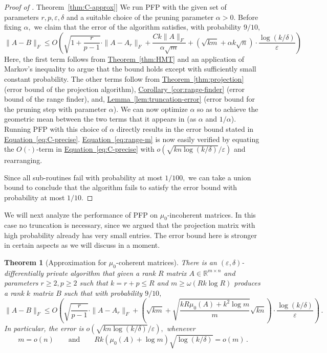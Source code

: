 \documentclass[letterpaper,11pt]{article}
\newtheorem{theorem}{Theorem}[section]
\theoremstyle{definition}
\newcommand{\corollaryref}[1]{\hyperref[cor:#1]{Corollary~\ref{cor:#1}}}
\newcommand{\equationlabel}[1]{\label{eq:#1}}
\newcommand{\equationref}[1]{\hyperref[eq:#1]{Equation~\ref{eq:#1}}}
\newcommand{\lemmaref}[1]{\hyperref[lem:#1]{Lemma~\ref{lem:#1}}}
\newcommand{\theoremlabel}[1]{\label{thm:#1}}
\newcommand{\theoremref}[1]{\hyperref[thm:#1]{Theorem~\ref{thm:#1}}}
\newcommand{\mper}{\,.}
\renewcommand{\le}{\leqslant}
\renewcommand{\ge}{\geqslant}
\newcommand{\R}{\mathbb{R}}
\renewcommand{\epsilon}{\varepsilon}
\newcommand{\PFP}{\textrm{\small PFP}\xspace}
\begin{document}
\begin{proof}[Proof of \theoremref{C-approx}]
We run \PFP with the given set of parameters $r,p,\epsilon,\delta$
and a suitable choice of the pruning parameter $\alpha>0.$
Before fixing $\alpha,$ we claim that the error of the algorithm satisfies,
with probability $9/10,$
\[
\|A-B\|_F
\le
O\left(
\sqrt{1+\frac r{p-1}}\cdot \|A-A_r\|_F
+ \frac{Ck\|A\|_F}{\alpha\sqrt{m}}
+\left(\sqrt{km}
+ \alpha k\sqrt{n}\right)
\cdot \frac{\log(k/\delta)}\epsilon\right)
\]
Here, the first term follows from \theoremref{HMT} and an application of
Markov's inequality to argue that the bound holds except with sufficiently
small constant probability. The other terms
follow from \theoremref{projection} (error bound of the
projection algorithm), \corollaryref{range-finder} (error bound of the range
finder), and, \lemmaref{truncation-error} (error bound for the pruning step
with parameter $\alpha$). We can now optimize $\alpha$ so as to achieve the
geometric mean between the two terms that it appears in (as $\alpha$ and
$1/\alpha$). Running \PFP with this choice of $\alpha$ directly results
in the error bound stated in
\equationref{C-precise}. \equationref{range-m} is now easily verified by
equating the $O(\cdot)$-term in \equationref{C-precise} with
$o(\sqrt{kn\log(k/\delta)}/\epsilon)$ and rearranging.

Since all sub-routines fail with probability at most $1/100,$ we can take a
union bound to conclude that the algorithm fails to satisfy the error bound
with probability at most $1/10.$
\end{proof}

We will next analyze the performance of \PFP on $\mu_0$-incoherent matrices. In this
case no truncation is necessary, since we argued that the projection matrix
with high probability already has very small entries. The error bound here is
stronger in certain aspects as we will discuss in a moment.

\begin{theorem}[Approximation for $\mu_0$-coherent matrices]
\theoremlabel{mu-approx}
There is an $(\epsilon,\delta)$-differentially private algorithm that
given a rank $R$ matrix $A\in\R^{m\times n}$ and parameters
$r\ge2,p\ge2$ such that $k=r+p\le R$ and $m\ge \omega(Rk \log R)$
produces a rank $k$ matrix $B$ such that with probability $9/10,$
\begin{equation}\equationlabel{mu-precise}
\|A-B\|_F
\le
O\left(\sqrt{\frac r{p-1}}\cdot \|A-A_r\|_F +
\left(\sqrt{km}
+ \sqrt{\frac{kR\mu_0(A)+k^2\log m}{m}}
\sqrt{kn}\right)
\cdot \frac{\log(k/\delta)}\epsilon
\right)\mper
\end{equation}
In particular, the error is $o\left(\sqrt{kn\log(k/\delta)}/\epsilon\right),$ whenever
\begin{equation}\equationlabel{range-m-2}
m = o(n) \qquad\text{and}\qquad
Rk(\mu_0(A)+\log m)\sqrt{\log(k/\delta)} = o(m)\mper
\end{equation}
\end{theorem}
\end{document}
